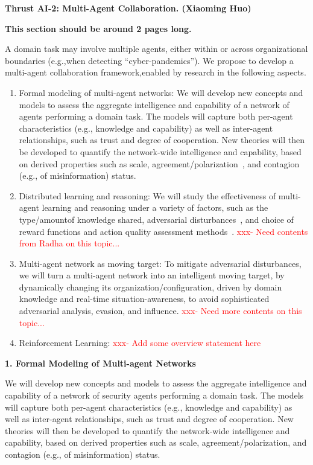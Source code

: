 \documentclass{NSF}
\begin{document}
\setcounter{section}{1}

\noindent \textbf{Thrust AI-2: Multi-Agent Collaboration. (Xiaoming Huo)}

\textbf{This section should be around 2 pages long.}


A domain task may involve multiple agents, either within or across organizational boundaries (e.g.,when detecting ``cyber-pandemics”).
We propose to develop a multi-agent collaboration framework,enabled by research in the following aspects.
\begin{enumerate}
\item Formal modeling of multi-agent networks:
We will develop new concepts and models to assess the aggregate intelligence and capability of a network of agents performing a domain task.
The models will capture both per-agent characteristics (e.g., knowledge and capability) as well as inter-agent relationships, such as trust and degree of cooperation.
New theories will then be developed to quantify the network-wide intelligence and capability, based on derived properties such as scale, agreement/polarization~\cite{wang22coevolution}, and contagion (e.g., of misinformation) status.

\item
Distributed learning and reasoning:
We will study the effectiveness of multi-agent learning and reasoning under a variety of factors, such as the type/amountof knowledge shared, adversarial disturbances~\cite{SilvestreRosaHespanhaSilvestreJun14}, and choice of reward functions and action quality assessment methods~\cite{radha_arel}.
\textcolor{red}{xxx- Need contents from Radha on this topic...}

\item
Multi-agent network as moving target:
To mitigate adversarial disturbances, we will turn a multi-agent network into an intelligent moving target, by dynamically changing its organization/configuration, driven by domain knowledge and real-time situation-awareness, to avoid sophisticated adversarial analysis, evasion, and influence.
\textcolor{red}{xxx- Need more contents on this topic...}

\item Reinforcement Learning: \textcolor{red}{xxx- Add some overview statement here}
\end{enumerate}



\noindent \textbf{1. Formal Modeling of Multi-agent Networks}

We will develop new concepts and models to assess the aggregate intelligence and capability of a network of security agents performing a domain task.
The models will capture both per-agent characteristics (e.g., knowledge and capability) as well as inter-agent relationships, such as trust and degree of cooperation.
New theories will then be developed to quantify the network-wide intelligence and capability, based on derived properties such as scale, agreement/polarization, and contagion (e.g., of misinformation) status.
\end{document}
